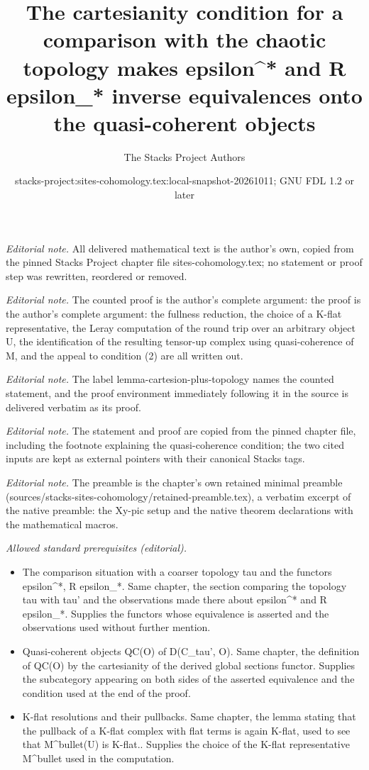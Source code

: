 \documentclass[10pt,a4paper]{amsart}
\title{The cartesianity condition for a comparison with the chaotic topology makes epsilon\textasciicircum{}* and R epsilon\_* inverse equivalences onto the quasi-coherent objects}
\author{The Stacks Project Authors}
\date{stacks-project:sites-cohomology.tex:local-snapshot-20261011; GNU FDL 1.2 or later}
\theoremstyle{plain}
\theoremstyle{definition}
\theoremstyle{remark}
\numberwithin{equation}{subsection}
\begin{document}
\maketitle
\noindent\textit{Editorial note.} All delivered mathematical text is the author's own, copied from the pinned Stacks Project chapter file sites-cohomology.tex; no statement or proof step was rewritten, reordered or removed.\par\medskip
\noindent\textit{Editorial note.} The counted proof is the author's complete argument: the proof is the author's complete argument: the fullness reduction, the choice of a K-flat representative, the Leray computation of the round trip over an arbitrary object U, the identification of the resulting tensor-up complex using quasi-coherence of M, and the appeal to condition (2) are all written out.\par\medskip
\noindent\textit{Editorial note.} The label lemma-cartesion-plus-topology names the counted statement, and the proof environment immediately following it in the source is delivered verbatim as its proof.\par\medskip
\noindent\textit{Editorial note.} The statement and proof are copied from the pinned chapter file, including the footnote explaining the quasi-coherence condition; the two cited inputs are kept as external pointers with their canonical Stacks tags.\par\medskip
\noindent\textit{Editorial note.} The preamble is the chapter's own retained minimal preamble (sources/stacks-sites-cohomology/retained-preamble.tex), a verbatim excerpt of the native preamble: the Xy-pic setup and the native theorem declarations with the mathematical macros.\par\medskip
\noindent\textit{Allowed standard prerequisites (editorial).}\begin{itemize}
\item The comparison situation with a coarser topology tau and the functors epsilon\textasciicircum{}*, R epsilon\_*. Same chapter, the section comparing the topology tau with tau' and the observations made there about epsilon\textasciicircum{}* and R epsilon\_*. Supplies the functors whose equivalence is asserted and the observations used without further mention.
\item Quasi-coherent objects QC(O) of D(C\_tau', O). Same chapter, the definition of QC(O) by the cartesianity of the derived global sections functor. Supplies the subcategory appearing on both sides of the asserted equivalence and the condition used at the end of the proof.
\item K-flat resolutions and their pullbacks. Same chapter, the lemma stating that the pullback of a K-flat complex with flat terms is again K-flat, used to see that M\textasciicircum{}bullet(U) is K-flat.. Supplies the choice of the K-flat representative M\textasciicircum{}bullet used in the computation.
\end{itemize}\medskip
\end{document}
